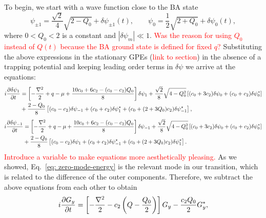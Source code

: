 To begin, we start with a wave function close to the BA state
\begin{equation}
    \psi_{\pm 1} = \frac{\sqrt{2}}{4}\sqrt{2 - Q_0} + \delta\psi_{\pm 1}(t),
    \qquad
    \psi_0 = \frac{1}{2}\sqrt{2 + Q_0} + \delta \psi_0(t),
\end{equation}
where \( 0 < Q_0 < 2 \) is a constant and \( |\delta\psi_m| \ll 1 \).
\textcolor{red}{Was the reason for using \( Q_0 \) instead of \( Q(t) \) because
    the BA ground state is defined for fixed \( q \)?}
Substituting the above expressions in the stationary GPEs
(\textcolor{red}{link to section}) in the absence of a trapping potential and
keeping leading order terms in \( \delta\psi \) we arrive at the equations:
\begin{equation}
    \begin{aligned}
        i\pdv{\delta\psi_1}{t} & = \left[-\frac{\nabla^2}{2} + q - \mu
            + \frac{10c_0+6c_2-(c_0-c_2)Q_0}{8}\right]\delta\psi_1
        + \frac{\sqrt{2}}{8}\sqrt{4-Q_0^2}\left[(c_0+3c_2)\delta\psi_0
        + (c_0+c_2)\delta\psi_0^*\right]                                         \\
                               & + \frac{2-Q_0}{8}\left[(c_0-c_2)\delta\psi_{-1}
            + (c_0+c_2)\delta\psi_1^*
            + (c_0 + (2+3Q_0)c_2)\delta\psi_{-1}^*\right],
    \end{aligned}
\end{equation}
\begin{equation}
    \begin{aligned}
        i\pdv{\delta\psi_{-1}}{t} & = \left[-\frac{\nabla^2}{2} + q - \mu
            + \frac{10c_0+6c_2-(c_0-c_2)Q_0}{8}\right]\delta\psi_{-1}
        + \frac{\sqrt{2}}{8}\sqrt{4-Q_0^2}\left[(c_0+3c_2)\delta\psi_0
        + (c_0+c_2)\delta\psi_0^*\right]                                           \\
                                  & + \frac{2-Q_0}{8}\left[(c_0-c_2)\delta\psi_{1}
            + (c_0+c_2)\delta\psi_{-1}^*
            + (c_0 + (2+3Q_0)c_2)\delta\psi_{1}^*\right].
    \end{aligned}
\end{equation}
\textcolor{red}{Introduce a variable to make equations more aesthetically
    pleasing.}
As we showed, Eq.~\eqref{eq: zero-mode-energy} is the relevant mode in our
transition, which is related to the difference of the outer components.
Therefore, we subtract the above equations from each other to obtain
\begin{equation}
    i\pdv{G_y}{t} = \left[-\frac{\nabla^2}{2} - c_2\left(Q
        - \frac{Q_0}{2}\right)\right]G_y - \frac{c_2Q_0}{2}G_y^*,
\end{equation}
